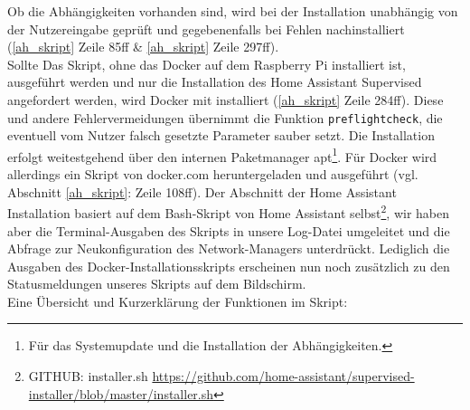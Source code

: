 \noindent Ob die Abhängigkeiten vorhanden sind, wird bei der Installation unabhängig von der Nutzereingabe geprüft und gegebenenfalls bei Fehlen nachinstalliert (\ref{ah_skript} Zeile 85ff \& \ref{ah_skript} Zeile 297ff).\\
\noindent Sollte Das Skript, ohne das Docker auf dem Raspberry Pi installiert ist, ausgeführt werden und nur die Installation des Home Assistant Supervised angefordert werden, wird Docker mit installiert (\ref{ah_skript} Zeile 284ff).
Diese und andere Fehlervermeidungen übernimmt die Funktion \texttt{preflightcheck}, die eventuell vom Nutzer falsch gesetzte Parameter sauber setzt.
Die Installation erfolgt weitestgehend über den internen Paketmanager apt\footnote{Für das Systemupdate und die Installation der Abhängigkeiten.}.
Für Docker wird allerdings ein Skript von docker.com heruntergeladen und ausgeführt (vgl. Abschnitt \ref{ah_skript}:  Zeile 108ff).
Der Abschnitt der Home Assistant Installation basiert auf dem Bash-Skript von Home Assistant selbst\footnote{GITHUB: installer.sh \url{https://github.com/home-assistant/supervised-installer/blob/master/installer.sh}}, wir haben aber die Terminal-Ausgaben des Skripts in unsere Log-Datei umgeleitet und die Abfrage zur Neukonfiguration des Network-Managers unterdrückt.
Lediglich die Ausgaben des Docker-Installationsskripts erscheinen nun noch zusätzlich zu den Statusmeldungen unseres Skripts auf dem Bildschirm.\\
\newpage
\noindent Eine Übersicht und Kurzerklärung der Funktionen im Skript:

